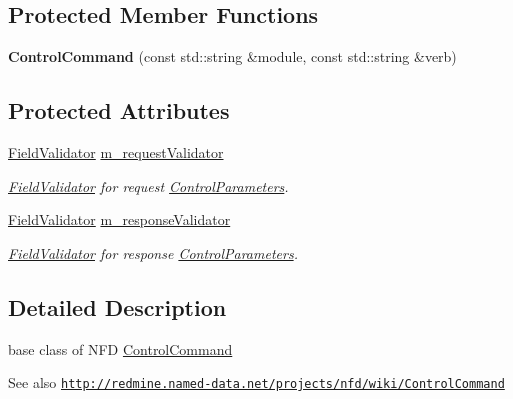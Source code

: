 \subsection*{Protected Member Functions}
\begin{DoxyCompactItemize}
\item 
{\bfseries Control\+Command} (const std\+::string \&module, const std\+::string \&verb)\hypertarget{classndn_1_1nfd_1_1ControlCommand_a0e0d448267aa4472a88b7103e3090d10}{}\label{classndn_1_1nfd_1_1ControlCommand_a0e0d448267aa4472a88b7103e3090d10}

\end{DoxyCompactItemize}
\subsection*{Protected Attributes}
\begin{DoxyCompactItemize}
\item 
\hyperlink{classndn_1_1nfd_1_1ControlCommand_1_1FieldValidator}{Field\+Validator} \hyperlink{classndn_1_1nfd_1_1ControlCommand_af936f10c7dbe8edd1af548290d74efb0}{m\+\_\+request\+Validator}
\begin{DoxyCompactList}\small\item\em \hyperlink{classndn_1_1nfd_1_1ControlCommand_1_1FieldValidator}{Field\+Validator} for request \hyperlink{classndn_1_1nfd_1_1ControlParameters}{Control\+Parameters}. \end{DoxyCompactList}\item 
\hyperlink{classndn_1_1nfd_1_1ControlCommand_1_1FieldValidator}{Field\+Validator} \hyperlink{classndn_1_1nfd_1_1ControlCommand_ae8a955d269aef120eb407f9354ce9dbe}{m\+\_\+response\+Validator}
\begin{DoxyCompactList}\small\item\em \hyperlink{classndn_1_1nfd_1_1ControlCommand_1_1FieldValidator}{Field\+Validator} for response \hyperlink{classndn_1_1nfd_1_1ControlParameters}{Control\+Parameters}. \end{DoxyCompactList}\end{DoxyCompactItemize}


\subsection{Detailed Description}
base class of N\+FD \hyperlink{classndn_1_1nfd_1_1ControlCommand}{Control\+Command} 

\begin{DoxySeeAlso}{See also}
\href{http://redmine.named-data.net/projects/nfd/wiki/ControlCommand}{\tt http\+://redmine.\+named-\/data.\+net/projects/nfd/wiki/\+Control\+Command} 
\end{DoxySeeAlso}


